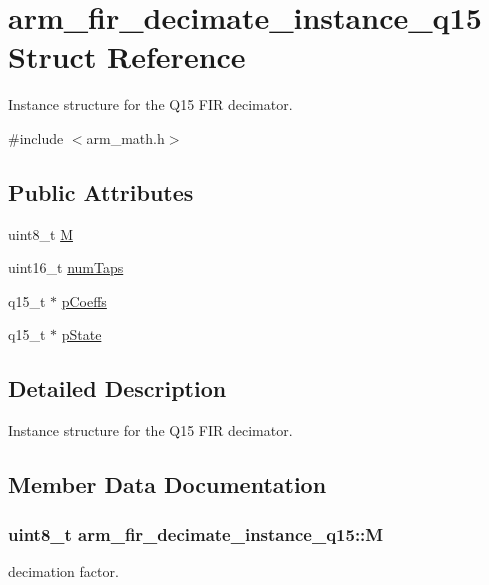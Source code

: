 \hypertarget{structarm__fir__decimate__instance__q15}{}\section{arm\+\_\+fir\+\_\+decimate\+\_\+instance\+\_\+q15 Struct Reference}
\label{structarm__fir__decimate__instance__q15}


Instance structure for the Q15 F\+IR decimator.  




{\ttfamily \#include $<$arm\+\_\+math.\+h$>$}

\subsection*{Public Attributes}
\begin{DoxyCompactItemize}
\item 
uint8\+\_\+t \hyperlink{structarm__fir__decimate__instance__q15_aad9320284218b3aa378527ea518cf093}{M}
\item 
uint16\+\_\+t \hyperlink{structarm__fir__decimate__instance__q15_ac1e9844488ec717da334fbd4c4f41990}{num\+Taps}
\item 
q15\+\_\+t $\ast$ \hyperlink{structarm__fir__decimate__instance__q15_a01cacab67e73945e8289075598ede14d}{p\+Coeffs}
\item 
q15\+\_\+t $\ast$ \hyperlink{structarm__fir__decimate__instance__q15_a3f7b5184bb28853ef401b001df121047}{p\+State}
\end{DoxyCompactItemize}


\subsection{Detailed Description}
Instance structure for the Q15 F\+IR decimator. 

\subsection{Member Data Documentation}
\subsubsection[{\texorpdfstring{M}{M}}]{\setlength{\rightskip}{0pt plus 5cm}uint8\+\_\+t arm\+\_\+fir\+\_\+decimate\+\_\+instance\+\_\+q15\+::M}\hypertarget{structarm__fir__decimate__instance__q15_aad9320284218b3aa378527ea518cf093}{}\label{structarm__fir__decimate__instance__q15_aad9320284218b3aa378527ea518cf093}
decimation factor. 
